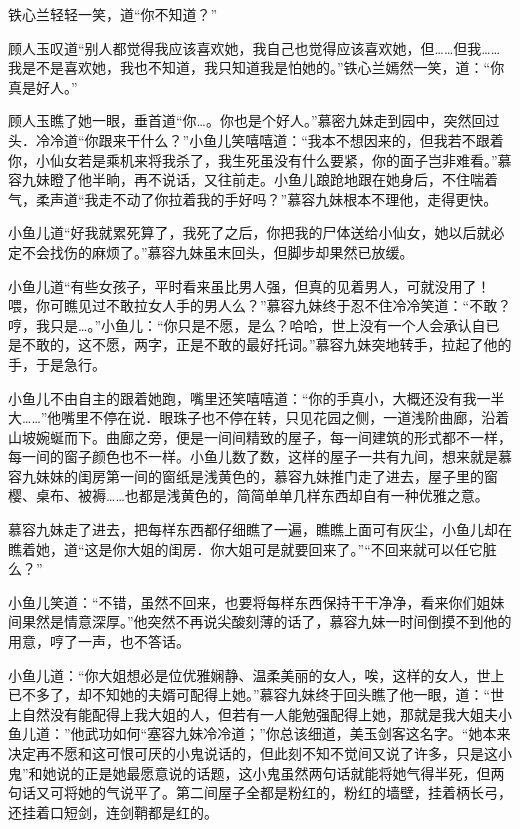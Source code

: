 \documentclass[12pt,oneside]{book}
\begin{document}
铁心兰轻轻一笑，道``你不知道？''

顾人玉叹道``别人都觉得我应该喜欢她，我自己也觉得应该喜欢她，但\ldots\ldots 但我\ldots\ldots 我是不是喜欢她，我也不知道，我只知道我是怕她的。''铁心兰嫣然一笑，道：``你真是好人。''

顾人玉瞧了她一眼，垂首道``你\ldots。你也是个好人。''慕密九妹走到园中，突然回过头．冷冷道``你跟来干什么？''小鱼儿笑嘻嘻道：``我本不想因来的，但我若不跟着你，小仙女若是乘机来将我杀了，我生死虽没有什么要紧，你的面子岂非难看。''慕容九妹瞪了他半晌，再不说话，又往前走。小鱼儿踉跄地跟在她身后，不住喘着气，柔声道``我走不动了你拉着我的手好吗？''慕容九妹根本不理他，走得更快。

小鱼儿道``好我就累死算了，我死了之后，你把我的尸体送给小仙女，她以后就必定不会找伤的麻烦了。''慕容九妹虽末回头，但脚步却果然已放缓。

小鱼儿道``有些女孩子，平时看来虽比男人强，但真的见着男人，可就没用了！喂，你可瞧见过不敢拉女人手的男人么？''慕容九妹终于忍不住冷冷笑道：``不敢？哼，我只是\ldots。''小鱼儿：``你只是不愿，是么？哈哈，世上没有一个人会承认自已是不敢的，这不愿，两字，正是不敢的最好托词。''慕容九妹突地转手，拉起了他的手，于是急行。

小鱼儿不由自主的跟着她跑，嘴里还笑嘻嘻道：``你的手真小，大概还没有我一半大\ldots\ldots{}''他嘴里不停在说．眼珠子也不停在转，只见花园之侧，一道浅阶曲廊，沿着山坡婉蜒而下。曲廊之旁，便是一间间精致的屋子，每一间建筑的形式都不一样，每一间的窗子颜色也不一样。小鱼儿数了数，这样的屋子一共有九间，想来就是慕容九妹妹的闺房第一间的窗纸是浅黄色的，慕容九妹推门走了进去，屋子里的窗樱、桌布、被褥\ldots\ldots 也都是浅黄色的，简简单单几样东西却自有一种优雅之意。

慕容九妹走了进去，把每样东西都仔细瞧了一遍，瞧瞧上面可有灰尘，小鱼儿却在瞧着她，道``这是你大姐的闺房．你大姐可是就要回来了。''``不回来就可以任它脏么？''

小鱼儿笑道：``不错，虽然不回来，也要将每样东西保持干干净净，看来你们姐妹间果然是情意深厚。''他突然不再说尖酸刻薄的话了，慕容九妹一时间倒摸不到他的用意，哼了一声，也不答话。

小鱼儿道：``你大姐想必是位优雅娴静、温柔美丽的女人，唉，这样的女人，世上已不多了，却不知她的夫婿可配得上她。''慕容九妹终于回头瞧了他一眼，道：``世上自然没有能配得上我大姐的人，但若有一人能勉强配得上她，那就是我大姐夫小鱼儿道：''他武功如何``塞容九妹冷冷道；''你总该细道，美玉剑客这名字。``她本来决定再不愿和这可恨可厌的小鬼说话的，但此刻不知不觉间又说了许多，只是这小鬼''和她说的正是她最愿意说的话题，这小鬼虽然两句话就能将她气得半死，但两句话又可将她的气说平了。第二间屋子全都是粉红的，粉红的墙壁，挂着柄长弓，还挂着口短剑，连剑鞘都是红的。
\end{document}
